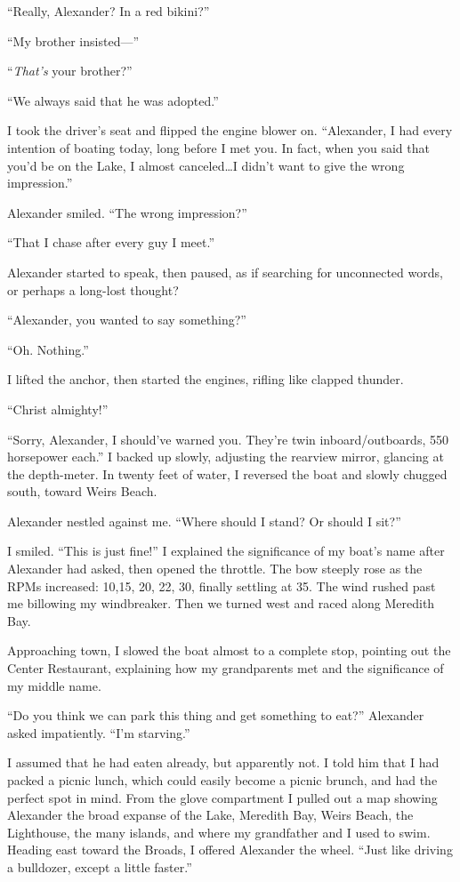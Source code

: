 ``Really, Alexander? In a red bikini?''

``My brother insisted---''

``\emph{That's} your brother?''

``We always said that he was adopted.''

I took the driver's seat and flipped the engine blower on. ``Alexander,
I had every intention of boating today, long before I met you. In fact,
when you said that you'd be on the Lake, I almost canceled\ldots I
didn't want to give the wrong impression.''

Alexander smiled. ``The wrong impression?''

``That I chase after every guy I meet.''

Alexander started to speak, then paused, as if searching for unconnected
words, or perhaps a long-lost thought?

``Alexander, you wanted to say something?''

``Oh. Nothing.''

I lifted the anchor, then started the engines, rifling like clapped
thunder.

``Christ almighty!''

``Sorry, Alexander, I should've warned you. They're twin
\linebreak inboard/outboards, 550 horsepower each.'' I backed up slowly, adjusting
the rearview mirror, glancing at the depth-meter. In twenty feet of
water, I reversed the boat and slowly chugged south, toward Weirs Beach.

Alexander nestled against me. ``Where should I stand? Or should I sit?''

I smiled. ``This is just fine!'' I explained the significance of my
boat's name after Alexander had asked, then opened the throttle. The bow
steeply rose as the RPMs increased: 10,15, 20, 22, 30, finally settling
at 35. The wind rushed past me billowing my windbreaker. Then we turned
west and raced along Meredith Bay.

Approaching town, I slowed the boat almost to a complete stop, pointing
out the Center Restaurant, explaining how my grandparents met and the
significance of my middle name.

``Do you think we can park this thing and get something to eat?''
Alexander asked impatiently. ``I'm starving.''

I assumed that he had eaten already, but apparently not. I told him that
I had packed a picnic lunch, which could easily become a picnic brunch,
and had the perfect spot in mind. From the glove compartment I pulled
out a map showing Alexander the broad expanse of the Lake, Meredith Bay,
Weirs Beach, the Lighthouse, the many islands, and where my grandfather
and I used to swim. Heading east toward the Broads, I offered Alexander
the wheel. ``Just like driving a bulldozer, except a little faster.''

